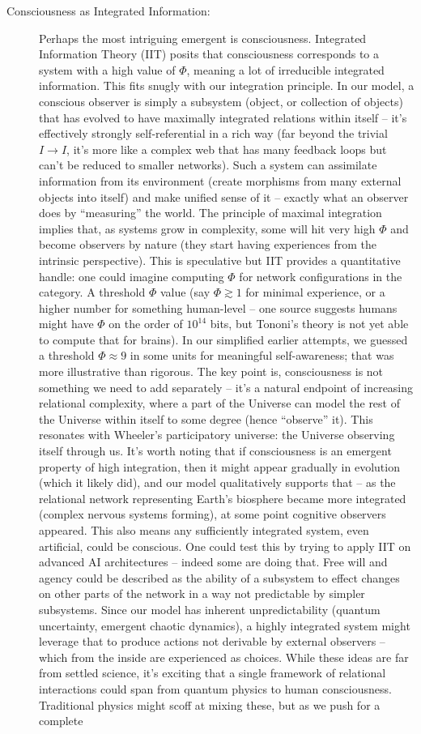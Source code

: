 \documentclass{article}
\begin{document}
\begin{description}
\item[Consciousness as Integrated Information:] Perhaps the most intriguing emergent is consciousness. Integrated Information Theory (IIT) posits that consciousness corresponds to a system with a high value of $\Phi$, meaning a lot of irreducible integrated information\cite{oizumi2014}. This fits snugly with our integration principle. In our model, a conscious observer is simply a subsystem (object, or collection of objects) that has evolved to have maximally integrated relations within itself – it’s effectively strongly self-referential in a rich way (far beyond the trivial $I \to I$, it’s more like a complex web that has many feedback loops but can’t be reduced to smaller networks). Such a system can assimilate information from its environment (create morphisms from many external objects into itself) and make unified sense of it – exactly what an observer does by “measuring” the world. The principle of maximal integration implies that, as systems grow in complexity, some will hit very high $\Phi$ and become observers by nature (they start having experiences from the intrinsic perspective). This is speculative but IIT provides a quantitative handle: one could imagine computing $\Phi$ for network configurations in the category. A threshold $\Phi$ value (say $\Phi \gtrsim 1$ for minimal experience, or a higher number for something human-level – one source suggests humans might have $\Phi$ on the order of $10^{14}$ bits, but Tononi’s theory is not yet able to compute that for brains). In our simplified earlier attempts, we guessed a threshold $\Phi \approx 9$ in some units for meaningful self-awareness; that was more illustrative than rigorous. The key point is, consciousness is not something we need to add separately – it’s a natural endpoint of increasing relational complexity, where a part of the Universe can model the rest of the Universe within itself to some degree (hence “observe” it). This resonates with Wheeler’s participatory universe: the Universe observing itself through us\cite{wheeler1989}. It’s worth noting that if consciousness is an emergent property of high integration, then it might appear gradually in evolution (which it likely did), and our model qualitatively supports that – as the relational network representing Earth’s biosphere became more integrated (complex nervous systems forming), at some point cognitive observers appeared. This also means any sufficiently integrated system, even artificial, could be conscious. One could test this by trying to apply IIT on advanced AI architectures – indeed some are doing that. Free will and agency could be described as the ability of a subsystem to effect changes on other parts of the network in a way not predictable by simpler subsystems. Since our model has inherent unpredictability (quantum uncertainty, emergent chaotic dynamics), a highly integrated system might leverage that to produce actions not derivable by external observers – which from the inside are experienced as choices. While these ideas are far from settled science, it’s exciting that a single framework of relational interactions could span from quantum physics to human consciousness. Traditional physics might scoff at mixing these, but as we push for a complete 
\end{description}
\end{document}
